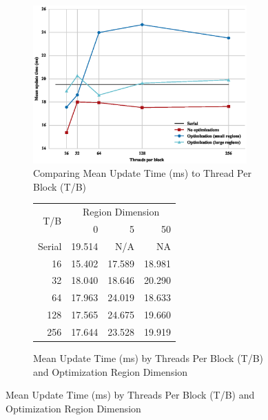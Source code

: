 \documentclass[onecolumn,12pt]{IEEEtran}
\begin{document}
  \begin{figure}[t]
    \centering
    \begin{subfigure}[t]{0.6\textwidth}
    \includegraphics[width=0.9\textwidth]{../images/plot.eps}
      \caption{Comparing Mean Update Time (ms) to Thread Per Block (T/B)}
      \label{fig:comparison}  
    \end{subfigure}
    \begin{subfigure}[t]{0.3\textwidth}
      \centering
      \begin{tabular}[b]{@{}*{4}{r}@{}} \toprule
          \multirow{2}{*}{T/B} 
          & \multicolumn{3}{c}{Region Dimension} \\
                           & 0        & 5       & 50 \\ \midrule 
          Serial           &  19.514  &  N/A    & NA \\
          16               &  15.402  &  17.589 &  18.981 \\
          32               &  18.040  &  18.646 &  20.290 \\
          64               &  17.963  &  24.019 &  18.633 \\
          128              &  17.565  &  24.675 &  19.660 \\
          256              &  17.644  &  23.528 & 19.919 \\ \bottomrule
      \end{tabular}
      \caption{Mean Update Time (ms) by Threads Per Block (T/B) and Optimization Region Dimension}
      \label{tab:means}
    \end{subfigure}

  \end{figure}
\end{document}
